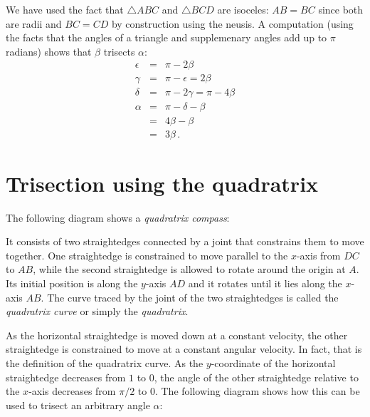 \documentclass[11pt,a4paper]{article}
\newcommand*{\qd}{quadratrix}
\begin{document}
We have used the fact that $\triangle ABC$ and $\triangle BCD$ are isoceles: $AB=BC$ since both are radii and $BC=CD$ by construction using the neusis. A computation (using the facts that the angles of a triangle and supplemenary angles add up to $\pi$ radians) shows that $\beta$ trisects $\alpha$:
\begin{eqnarray*}
\epsilon &=& \pi - 2\beta\\
\gamma &=& \pi - \epsilon = 2\beta\\
\delta &=& \pi - 2\gamma = \pi - 4\beta\\
\alpha &=& \pi - \delta - \beta\\
&=& 4\beta -\beta\\
&=& 3\beta\,.
\end{eqnarray*}


\section{Trisection using the \qd{}}\label{s.q}

The following diagram shows a \emph{\qd{} compass}:
\begin{center}
\end{center}
It consists of two straightedges connected by a joint that constrains them to move together. One straightedge is constrained to move parallel to the $x$-axis from $DC$ to $AB$, while the second straightedge is allowed to rotate around the origin at $A$. Its initial position is along the $y$-axis $AD$ and it rotates until it lies along the $x$-axis $AB$. The curve traced by the joint of the two straightedges is called the \emph{\qd{} curve} or simply the \emph{\qd{}}.

As the horizontal straightedge is moved down at a constant velocity, the other straightedge is constrained to move at a constant angular velocity. In fact, that is the definition of the \qd{} curve. As the $y$-coordinate of the horizontal straightedge decreases from $1$ to $0$, the angle of the other straightedge relative to the $x$-axis decreases from $\pi/2$ to $0$. The following diagram shows how this can be used to trisect an arbitrary angle $\alpha$:
\end{document}
